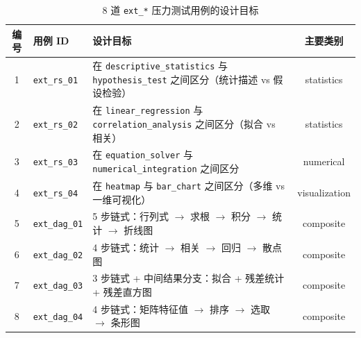 {    \begin{table}[htbp]
        \centering
        \caption{\label{tab:appendix-ext-cases}8 道 \texttt{ext\_*} 压力测试用例的设计目标}
        \begin{tabularx}{\linewidth}{clXc}
            \toprule
            编号 & 用例 ID & 设计目标 & 主要类别 \\ \midrule
            1 & \texttt{ext\_rs\_01} & 在 \texttt{descriptive\_statistics} 与 \texttt{hypothesis\_test} 之间区分（统计描述 vs 假设检验） & statistics \\
            2 & \texttt{ext\_rs\_02} & 在 \texttt{linear\_regression} 与 \texttt{correlation\_analysis} 之间区分（拟合 vs 相关） & statistics \\
            3 & \texttt{ext\_rs\_03} & 在 \texttt{equation\_solver} 与 \texttt{numerical\_integration} 之间区分 & numerical \\
            4 & \texttt{ext\_rs\_04} & 在 \texttt{heatmap} 与 \texttt{bar\_chart} 之间区分（多维 vs 一维可视化） & visualization \\
            5 & \texttt{ext\_dag\_01} & 5 步链式：行列式 $\to$ 求根 $\to$ 积分 $\to$ 统计 $\to$ 折线图 & composite \\
            6 & \texttt{ext\_dag\_02} & 4 步链式：统计 $\to$ 相关 $\to$ 回归 $\to$ 散点图 & composite \\
            7 & \texttt{ext\_dag\_03} & 3 步链式 + 中间结果分支：拟合 + 残差统计 + 残差直方图 & composite \\
            8 & \texttt{ext\_dag\_04} & 4 步链式：矩阵特征值 $\to$ 排序 $\to$ 选取 $\to$ 条形图 & composite \\ \bottomrule
        \end{tabularx}
    \end{table}

    \removeappendixsubsecmajornumbering
}
